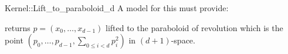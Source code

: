 \begin{ccRefFunctionObjectConcept}{Kernel::Lift_to_paraboloid_d}
A model for this must provide:


{returns $p = (x_0,\ldots,x_{d-1})$ lifted to the paraboloid 
of revolution which is the point 
$(p_0, \ldots,p_{d-1},\sum_{0 \le i < d}p_i^2)$ in $(d+1)$-space.}

\end{ccRefFunctionObjectConcept}
